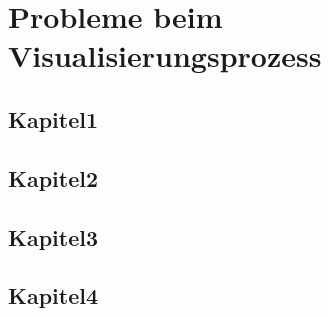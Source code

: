 \chapter{Probleme beim Visualisierungsprozess}
\section{Kapitel1}
\section{Kapitel2}
\section{Kapitel3}
\section{Kapitel4}